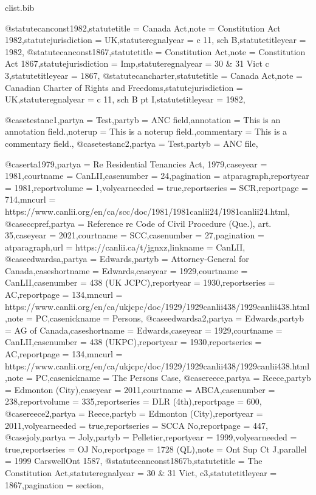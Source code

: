 \begin{filecontents*}[overwrite]{clist\jobname.bib}

@statute{canconst1982,statutetitle = {Canada Act},note = {Constitution Act 1982},statutejurisdiction = {UK},statuteregnalyear = {c 11, sch B},statutetitleyear = {1982},}
@statute{canconst1867,statutetitle = {Constitution Act},note = {Constitution Act 1867},statutejurisdiction = {Imp},statuteregnalyear = {30 \& 31 Vict c 3},statutetitleyear = {1867},}
@statute{cancharter,statutetitle = {Canada Act},note = {Canadian Charter of Rights and Freedoms},statutejurisdiction = {UK},statuteregnalyear = {c 11, sch B pt I},statutetitleyear = {1982},}

@case{testanc1,partya = {Test},partyb = {ANC field},annotation = {This is an annotation field.},noterup = {This is a noterup field.},commentary = {This is a commentary field.},}
@case{testanc2,partya = {Test},partyb = {ANC file},}

@case{rta1979,partya =  {Re Residential Tenancies Act, 1979},caseyear =  {1981},courtname =  {CanLII},casenumber =  {24},pagination =  {atparagraph},reportyear =  {1981},reportvolume =  {1},volyearneeded =  {true},reportseries =  {SCR},reportpage =  {714},mncurl =  {https://www.canlii.org/en/ca/scc/doc/1981/1981canlii24/1981canlii24.html},}
@case{ccpref,partya =  {Reference re Code of Civil Procedure (Que.), art. 35},caseyear =  {2021},courtname =  {SCC},casenumber =  {27},pagination =  {atparagraph},url =  {https://canlii.ca/t/jgnxz},linkname =  {CanLII},}
@case{edwardsa,partya =  {Edwards},partyb =  {Attorney‑General for Canada},caseshortname =  {Edwards},caseyear =  {1929},courtname =  {CanLII},casenumber =  {438 (UK JCPC)},reportyear =  {1930},reportseries =  {AC},reportpage =  {134},mncurl =  {https://www.canlii.org/en/ca/ukjcpc/doc/1929/1929canlii438/1929canlii438.html},note =  {PC},casenickname =  {Persons},}
@case{edwardsa2,partya =  {Edwards},partyb =  {AG of  Canada},caseshortname =  {Edwards},caseyear =  {1929},courtname =  {CanLII},casenumber =  {438 (UKPC)},reportyear =  {1930},reportseries =  {AC},reportpage =  {134},mncurl =  {https://www.canlii.org/en/ca/ukjcpc/doc/1929/1929canlii438/1929canlii438.html},note =  {PC},casenickname =  {The Persons Case},}
@case{reece,partya = {Reece},partyb = {Edmonton (City)},caseyear = {2011},courtname = {ABCA},casenumber = {238},reportvolume = {335},reportseries = {DLR (4th)},reportpage = {600},}
@case{reece2,partya = {Reece},partyb = {Edmonton (City)},reportyear = {2011},volyearneeded = {true},reportseries = {SCCA No},reportpage = {447},}
@case{joly,partya = {Joly},partyb = {Pelletier},reportyear = {1999},volyearneeded = {true},reportseries = {OJ No},reportpage = {1728 (QL)},note = {Ont Sup Ct J},parallel = {1999 CarswellOnt 1587},}
@statute{canconst1867b,statutetitle = {The Constitution Act},statuteregnalyear = {30 \& 31 Vict, c3},statutetitleyear = {1867},pagination = {section},}


\end{filecontents*}
